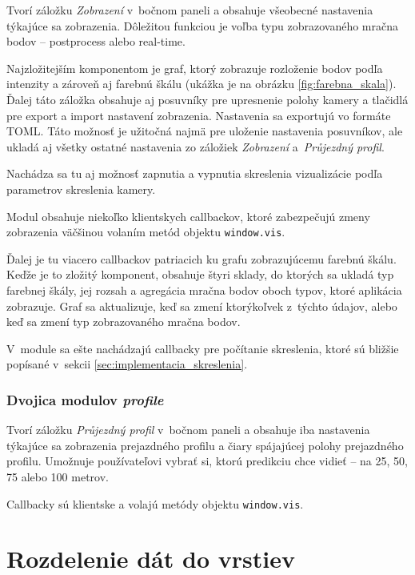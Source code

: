Tvorí záložku \emph{Zobrazení} v~bočnom paneli a obsahuje všeobecné nastavenia týkajúce sa zobrazenia. Dôležitou funkciou je voľba typu zobrazovaného mračna bodov -- postprocess alebo real-time.

Najzložitejším komponentom je graf, ktorý zobrazuje rozloženie bodov podľa intenzity a zároveň aj farebnú škálu (ukážka je na obrázku \ref{fig:farebna_skala}). Ďalej táto záložka obsahuje aj posuvníky pre upresnenie polohy kamery a tlačidlá pre export a import nastavení zobrazenia. Nastavenia sa exportujú vo formáte TOML. Táto možnosť je užitočná najmä pre uloženie nastavenia posuvníkov, ale ukladá aj všetky ostatné nastavenia zo záložiek \emph{Zobrazení} a~\emph{Průjezdný profil}.

Nachádza sa tu aj možnosť zapnutia a vypnutia skreslenia vizualizácie podľa parametrov skreslenia kamery.

Modul obsahuje niekoľko klientskych callbackov, ktoré zabezpečujú zmeny zobrazenia väčšinou volaním metód objektu \texttt{window.vis}.

Ďalej je tu viacero callbackov patriacich ku grafu zobrazujúcemu farebnú škálu. Keďže je to zložitý komponent, obsahuje štyri sklady, do ktorých sa ukladá typ farebnej škály, jej rozsah a agregácia mračna bodov oboch typov, ktoré aplikácia zobrazuje. Graf sa aktualizuje, keď sa zmení ktorýkoľvek z~týchto údajov, alebo keď sa zmení typ zobrazovaného mračna bodov.

V~module sa ešte nachádzajú callbacky pre počítanie skreslenia, ktoré sú bližšie popísané v~sekcii \ref{sec:implementacia_skreslenia}.

\subsubsection{Dvojica modulov \emph{profile} }

Tvorí záložku \emph{Průjezdný profil} v~bočnom paneli a obsahuje iba nastavenia týkajúce sa zobrazenia prejazdného profilu a čiary spájajúcej polohy prejazdného profilu. Umožnuje používateľovi vybrať si, ktorú predikciu chce vidieť -- na 25, 50, 75 alebo 100 metrov.

Callbacky sú klientske a volajú metódy objektu \texttt{window.vis}.

\section{Rozdelenie dát do vrstiev}
\label{sec:vrstvy}

